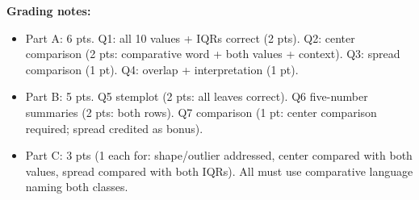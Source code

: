 \documentclass[10pt]{article}
\begin{document}
\boxguard
\begin{teachernote}[Homework]
\textbf{Grading notes:}
\begin{itemize}[itemsep=2pt]
  \item Part A: 6 pts. Q1: all 10 values + IQRs correct (2 pts). Q2: center comparison (2 pts: comparative word + both values + context). Q3: spread comparison (1 pt). Q4: overlap + interpretation (1 pt).
  \item Part B: 5 pts. Q5 stemplot (2 pts: all leaves correct). Q6 five-number summaries (2 pts: both rows). Q7 comparison (1 pt: center comparison required; spread credited as bonus).
  \item Part C: 3 pts (1 each for: shape/outlier addressed, center compared with both values, spread compared with both IQRs). All must use comparative language naming both classes.
\end{itemize}
\end{teachernote}
\end{document}
